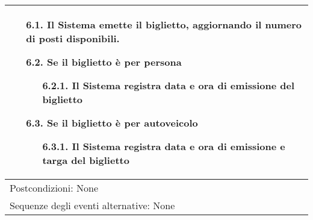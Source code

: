 \documentclass{article}
\begin{document}
\begin{table}[h!]
\begin{tabular}{|p{}|}
\begin{itemize}[leftmargin=1.2em]
			\begin{itemize}
			\item[6.1.] Il Sistema emette il biglietto, 
	aggiornando il numero di posti 
	disponibili.
			\item[6.2.] Se il biglietto è per persona
				\vspace{-0.1\baselineskip}
				\begin{itemize}[leftmargin=2.8em]
					\item[6.2.1.] Il Sistema registra data e ora di emissione del biglietto
				\end{itemize}
				\item[6.3.] Se il biglietto è per autoveicolo
				\vspace{-0.1\baselineskip}
				\begin{itemize}[leftmargin=2.8em]
					\item[6.3.1.] Il Sistema registra data e ora di emissione e targa del biglietto
				\end{itemize}
			\end{itemize}
			\vspace{-0.4\baselineskip}
		\end{itemize}
		\vspace{-1.5\baselineskip}
		\\
		\hline
		Postcondizioni: None\\
		\hline
		Sequenze degli eventi alternative: None\\
		\hline
	\end{tabular}
	\label{tab:tab18}
\end{table}
\end{document}
